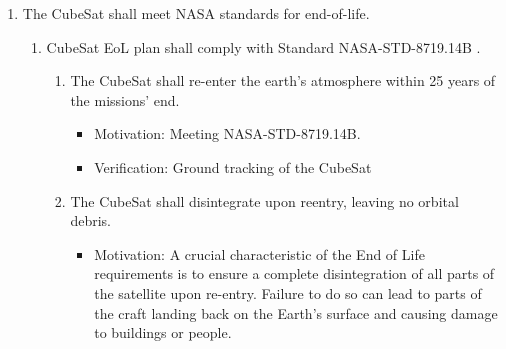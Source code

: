 \begin{enumerate}
\begin{enumerate}
\begin{enumerate}
\begin{itemize}
                    \item Motivation: Orientation with the magnetic field is required by scientific payload and pointing accuracy gives margin of error from current state-of-the-art GNC systems which can produce point accuracy of better than 0.2° 
                    \item Verification: Engaging GNC system in vacuum chamber test facility. 
                \end{itemize}
            \item The CubeSat shall be able to receive information from the ground station at a minimum rate of 2 kb/s.
                \begin{itemize}
                    \item Motivation: Ability to retrieve scientific data during operation and allow for less computational resources required to store data onboard. 
                    \item Verification: Communications system turned on and sample data packets sent from the CubeSat at a separate location to the ground station with decoding software showing the expected data.  
                \end{itemize}
        \end{enumerate}
    \end{enumerate} %
    \item The CubeSat shall meet NASA standards for end-of-life.
    \begin{enumerate}
        \item CubeSat EoL plan shall comply with Standard NASA-STD-8719.14B \cite{STD8719}. 
        \begin{enumerate}
            \item The CubeSat shall re-enter the earth’s atmosphere within 25 years of the missions’ end. 
               \begin{itemize}
                    \item Motivation: Meeting NASA-STD-8719.14B.
                    \item Verification: Ground tracking of the CubeSat
                \end{itemize}
            \item The CubeSat shall disintegrate upon reentry, leaving no orbital debris. 
                \begin{itemize}
                    \item Motivation: A crucial characteristic of the End of Life requirements is to ensure a complete disintegration of all parts of the satellite upon re-entry. Failure to do so can lead to parts of the craft landing back on the Earth’s surface and causing damage to buildings or people.

\end{itemize}
\end{enumerate}
\end{enumerate}
\end{enumerate}
